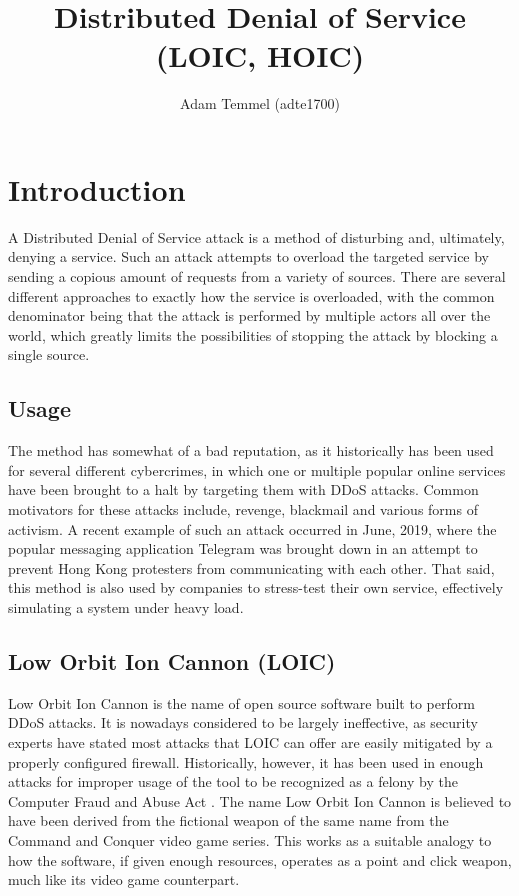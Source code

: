 \documentclass[a4paper, titlepage,12pt]{article}
\title{Distributed Denial of Service (LOIC, HOIC)}
\author{Adam Temmel (adte1700)}
\begin{document}
	\maketitle
	\section{Introduction}\label{sec:introduction}
		A Distributed Denial of Service attack is a method of disturbing and, ultimately, denying a service. Such an attack attempts to overload the targeted service by sending a copious amount of requests from a variety of sources. There are several different approaches to exactly how the service is overloaded, with the common denominator being that the attack is performed by multiple actors all over the world, which greatly limits the possibilities of stopping the attack by blocking a single source. 
	\subsection{Usage}\label{sec:usage}
		The method has somewhat of a bad reputation, as it historically has been used for several different cybercrimes, in which one or multiple popular online services have been brought to a halt by targeting them with DDoS attacks. Common motivators for these attacks include, revenge, blackmail and various forms of activism. A recent example of such an attack occurred in June, 2019, where the popular messaging application Telegram was brought down in an attempt to prevent Hong Kong protesters  from communicating with each other\cite{attacktelegram}. That said, this method is also used by companies to stress-test their own service, effectively simulating a system under heavy load.
	\subsection{Low Orbit Ion Cannon (LOIC)}
		Low Orbit Ion Cannon is the name of open source software built to perform DDoS attacks. It is nowadays considered to be largely ineffective, as security experts have stated most attacks that LOIC can offer are easily mitigated by a properly configured firewall. Historically, however, it has been used in enough attacks for improper usage of the tool to be recognized as a felony by the Computer Fraud and Abuse Act \cite{outlawddos}\cite{megauploadstrike}. The name Low Orbit Ion Cannon is believed to have been derived from the fictional weapon of the same name from the Command and Conquer video game series. This works as a suitable analogy to how the software, if given enough resources, operates as a point and click weapon, much like its video game counterpart\cite{loic}.
\end{document}
